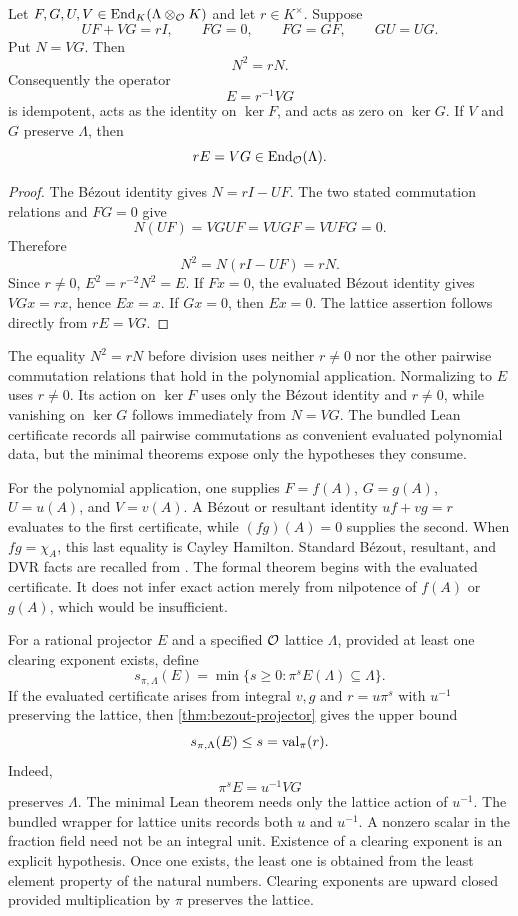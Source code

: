\begin{theorem}\label{thm:bezout-projector}
Let $F,G,U,V\in\operatorname{End}_K(\Lambda\otimes_{\mathcal O} K)$ and let $r\in K^\times$.
Suppose
\[
UF+VG=rI,
\qquad FG=0,
\qquad FG=GF,
\qquad GU=UG.
\]
Put $N=VG$. Then
\[
\boxed{N^2=rN.}
\]
Consequently the operator
\[
\boxed{
E=r^{-1}VG
}
\]
is idempotent, acts as the identity on $\ker F$, and acts as zero on
$\ker G$. If $V$ and $G$ preserve $\Lambda$, then
\[
rE=VG\in\operatorname{End}_{\mathcal O}(\Lambda).
\]
\end{theorem}

\begin{proof}
The B\'ezout identity gives $N=rI-UF$. The two stated commutation relations
and $FG=0$ give
\[
N(UF)=VGUF=VUGF=VUFG=0.
\]
Therefore
\[
N^2=N(rI-UF)=rN.
\]
Since $r\ne0$, $E^2=r^{-2}N^2=E$. If $Fx=0$, the evaluated B\'ezout
identity gives $VGx=rx$, hence $Ex=x$. If $Gx=0$, then $Ex=0$.
The lattice assertion follows directly from $rE=VG$.
\end{proof}

The equality $N^2=rN$ before division uses neither $r\ne0$ nor the other
pairwise commutation relations that hold in the polynomial application.
Normalizing to $E$ uses $r\ne0$. Its action on $\ker F$ uses only the B\'ezout
identity and $r\ne0$, while vanishing on $\ker G$ follows immediately from $N=VG$.
The bundled Lean certificate records all pairwise commutations as convenient
evaluated polynomial data, but the minimal theorems expose only the hypotheses
they consume.

For the polynomial application, one supplies $F=f(A)$, $G=g(A)$,
$U=u(A)$, and $V=v(A)$. A B\'ezout or resultant identity
$uf+vg=r$ evaluates to the first certificate, while
$(fg)(A)=0$ supplies the second. When $fg=\chi_A$, this last equality is
Cayley Hamilton. Standard B\'ezout, resultant, and DVR facts are recalled
from \cite{Lang2002,Serre1979}. The formal theorem begins with the evaluated
certificate. It does not infer exact action merely from nilpotence of
$f(A)$ or $g(A)$, which would be insufficient.

\begin{definition}\label{def:separation-weight}
For a rational projector $E$ and a specified ${\mathcal O}$ lattice $\Lambda$, provided
at least one clearing exponent exists, define
\[
s_{\pi,\Lambda}(E)
=
\min\{s\ge0:\pi^sE(\Lambda)\subseteq\Lambda\}.
\]
If the evaluated certificate arises from integral $v,g$ and
$r=u\pi^s$ with $u^{-1}$ preserving the lattice, then
\cref{thm:bezout-projector} gives the upper bound
\[
s_{\pi,\Lambda}(E)\le s=\operatorname{val}_\pi(r).
\]
Indeed,
\[
\boxed{\pi^sE=u^{-1}VG}
\]
preserves $\Lambda$. The minimal Lean theorem needs only the lattice action of
$u^{-1}$. The bundled wrapper for lattice units records both $u$ and $u^{-1}$.
A nonzero scalar in the fraction field need not be an integral unit.
Existence of a clearing exponent is an explicit hypothesis. Once one exists,
the least one is obtained from the least element property of the natural numbers.
Clearing exponents are upward closed provided multiplication by $\pi$
preserves the lattice.
\end{definition}

